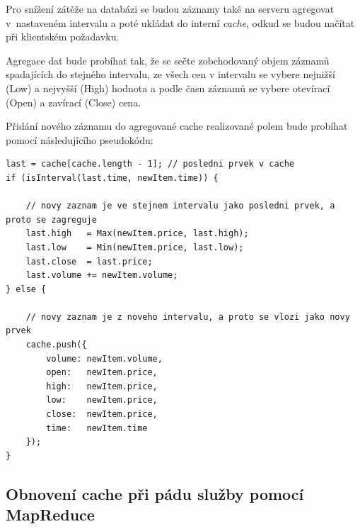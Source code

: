 \documentclass[thesis=M,czech]{FITthesis}[2012/06/26]
\begin{document}
	Pro snížení zátěže na databázi se budou záznamy také na serveru agregovat v~nastaveném intervalu a poté ukládat do interní \textit{cache}, odkud se budou načítat při klientském požadavku.
	
	Agregace dat bude probíhat tak, že se sečte zobchodovaný objem záznamů spadajících do stejného intervalu, ze všech cen v intervalu se vybere nejnižší (Low) a nejvyšší (High) hodnota a podle času záznamů se vybere otevírací (Open) a zavírací (Close) cena. 
	
	Přidání nového záznamu do agregované cache realizované polem bude probíhat pomocí následujícího pseudokódu:


\begin{lstlisting}[basicstyle={\tiny\ttfamily}, frame=single] 
last = cache[cache.length - 1]; // posledni prvek v cache
if (isInterval(last.time, newItem.time)) {

	// novy zaznam je ve stejnem intervalu jako posledni prvek, a proto se zagreguje
	last.high 	= Max(newItem.price, last.high);
	last.low 	= Min(newItem.price, last.low);
	last.close 	= last.price;
	last.volume += newItem.volume;
} else {

	// novy zaznam je z noveho intervalu, a proto se vlozi jako novy prvek 
	cache.push({
		volume: newItem.volume,
		open: 	newItem.price,
		high: 	newItem.price,
		low: 	newItem.price,
		close: 	newItem.price,
		time: 	newItem.time
	});
}

\end{lstlisting}


\subsection{Obnovení cache při pádu služby pomocí MapReduce}
	
\end{document}

